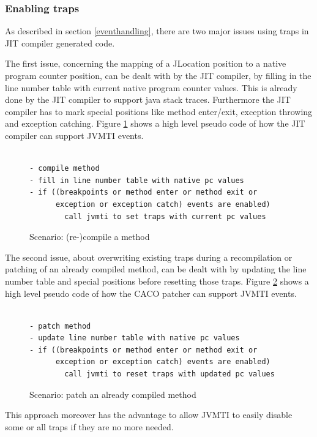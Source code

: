 \subsubsection{Enabling traps}
\label{traps}
As described in section \ref{eventhandling}, there are two major issues using traps in JIT compiler generated code. 

The first issue, concerning the mapping of a JLocation position to a native program counter position, can be dealt with by the JIT compiler, by filling in the line number table with current native program counter values. This is already done by the JIT compiler to support java stack traces. Furthermore the JIT compiler has to mark special positions like method enter/exit, exception throwing and exception catching. Figure \ref{scenariocompile} shows a high level pseudo code of how the JIT compiler can support JVMTI events.

\begin{figure}[h]
\begin{verbatim}

- compile method
- fill in line number table with native pc values
- if ((breakpoints or method enter or method exit or
      exception or exception catch) events are enabled) 
        call jvmti to set traps with current pc values
\end{verbatim}
\caption{Scenario: (re-)compile a method}
\label{scenariocompile}
\end{figure}


The second issue, about overwriting existing traps during a recompilation or patching of an already compiled method, can be dealt with by updating the line number table and special positions before resetting those traps. Figure \ref{scenariopatch} shows a high level pseudo code of how the CACO patcher can support JVMTI events.

\begin{figure}[h]
\begin{verbatim}

- patch method
- update line number table with native pc values
- if ((breakpoints or method enter or method exit or
      exception or exception catch) events are enabled) 
        call jvmti to reset traps with updated pc values
\end{verbatim}
\caption{Scenario: patch an already compiled method}
\label{scenariopatch}
\end{figure}

This approach moreover has the advantage to allow JVMTI to easily disable some or all traps if they are no more needed.

